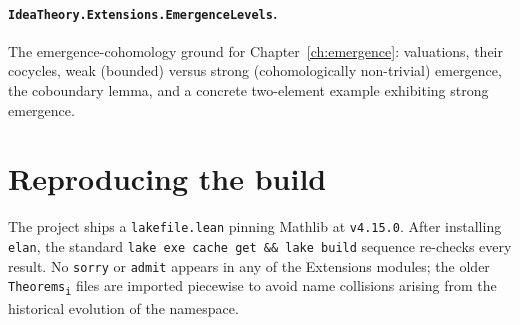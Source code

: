 \paragraph{\texttt{IdeaTheory.Extensions.EmergenceLevels}.}
The emergence-cohomology ground for Chapter~\ref{ch:emergence}:
valuations, their cocycles, weak (bounded) versus strong (cohomologically
non-trivial) emergence, the coboundary lemma, and a concrete two-element
example exhibiting strong emergence.

\section*{Reproducing the build}

The project ships a \texttt{lakefile.lean} pinning Mathlib at
\texttt{v4.15.0}. After installing \texttt{elan}, the standard
\texttt{lake exe cache get \&\& lake build} sequence re-checks every
result. No \texttt{sorry} or \texttt{admit} appears in any of the
Extensions modules; the older \texttt{Theorems\textsubscript{i}} files
are imported piecewise to avoid name collisions arising from the
historical evolution of the namespace.
